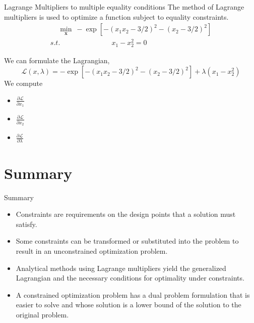 \documentclass{beamer}
\begin{document}
\begin{frame}{Lagrange Multipliers to multiple equality conditions}
The method of Lagrange multipliers is used to optimize a function subject to equality
constraints. 
\begin{gather*}
    ~~~~~ \underset{\boldsymbol{x}}{\min} ~ -\exp[-(x_1x_2-3/2)^2 - (x_2-3/2)^2] \\
    {s.t.}~~~~~~~~~~~~~~~~~~~~~~~~~~~~~~~~~ x_1 - x_2^2 = 0 
\end{gather*}

We can formulate the Lagrangian, 
\begin{equation*}
    \mathcal{L}(x, \lambda) = -\exp[-(x_1x_2-3/2)^2 - (x_2-3/2)^2] + \lambda(x_1 - x_2^2)
\end{equation*}
We compute
\begin{itemize}
    \item $\frac{\partial \mathcal{L}}{\partial x_1}$
    \item $\frac{\partial \mathcal{L}}{\partial x_2}$
    \item $\frac{\partial \mathcal{L}}{\partial \lambda}$
\end{itemize}

\end{frame}

\section{Summary}
\begin{frame}{Summary}
    \begin{itemize}
        \item Constraints are requirements on the design points that a solution must satisfy.
        \item Some constraints can be transformed or substituted into the problem to result in an unconstrained optimization problem.
        \item Analytical methods using Lagrange multipliers yield the generalized Lagrangian and the necessary conditions for optimality under constraints.
        \item A constrained optimization problem has a dual problem formulation that is easier to solve and whose solution is a lower bound of the solution to the original problem.
    \end{itemize}
\end{frame}
\end{document}
